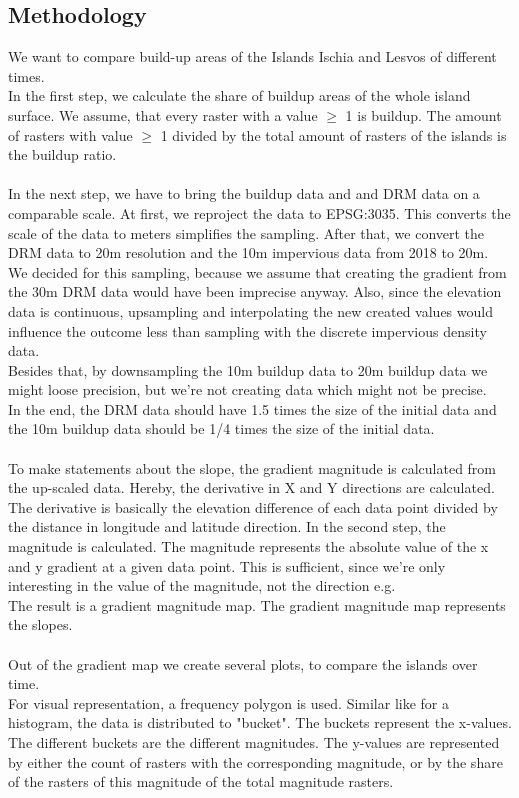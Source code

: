 \documentclass[10pt, twocolumn, twoside]{article}
\begin{document}
\subsection{Methodology}\label{meth}
We want to compare build-up areas of the Islands Ischia and Lesvos of different times.\\
In the first step, we calculate the share of buildup areas of the whole island surface. We assume, that every raster with a value $\geq$ 1 is buildup. The amount of rasters with value $\geq$ 1 divided by the total amount of rasters of the islands is the buildup ratio.\\\\
In the next step, we have to bring the buildup data and and DRM data on a comparable scale. At first, we reproject the data to EPSG:3035. This converts the scale of the data to meters simplifies the sampling. After that, we convert the DRM data to 20m resolution and the 10m impervious data from 2018 to 20m. We decided for this sampling, because we assume that creating the gradient from the 30m DRM data would have been imprecise anyway. Also, since the elevation data is continuous, upsampling and interpolating the new created values would influence the outcome less than sampling with the discrete impervious density data. \\
Besides that, by downsampling the 10m buildup data to 20m buildup data we might loose precision, but we're not creating data which might not be precise.  \\
In the end, the DRM data should have 1.5 times the size of the initial data and the 10m buildup data should be 1/4 times the size of the initial data.
\\\\
To make statements about the slope, the gradient magnitude is calculated from the up-scaled data. Hereby,  the derivative in X and Y directions are calculated. The derivative is basically the elevation difference of each data point divided by the distance in longitude and latitude direction.  In the second step, the magnitude is calculated. The magnitude represents the absolute value of the x and y gradient at a given data point. This is sufficient, since we're only interesting in the value of the magnitude, not the direction e.g.\\
The result is a gradient magnitude map. The gradient magnitude map represents the slopes. \\\\
Out of the gradient map we create several plots, to compare the islands over time. \\
For visual representation, a frequency polygon is used. Similar like for a histogram, the data is distributed to "bucket". The buckets represent the x-values. The different buckets are the different magnitudes. The y-values are represented by either the count of rasters with the corresponding magnitude, or by the share of the rasters of this magnitude of the total magnitude rasters.
\\\\
\end{document}
